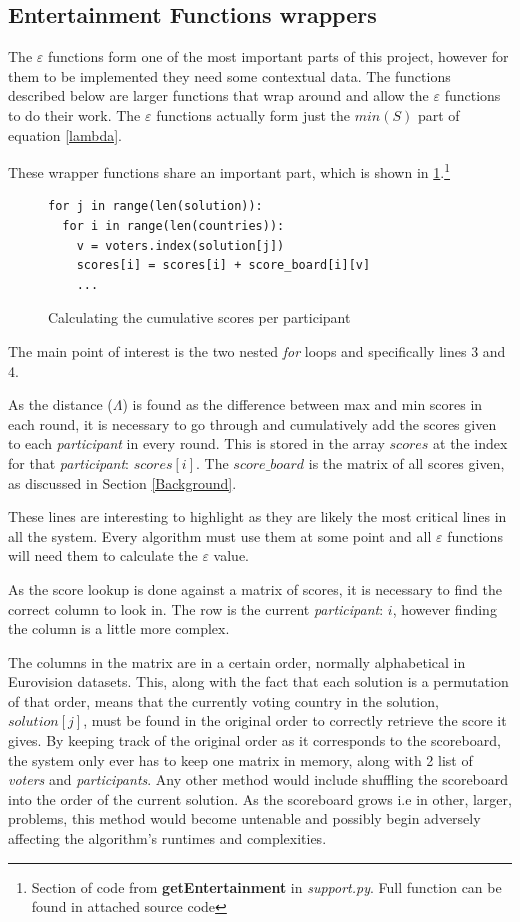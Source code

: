 \documentclass[12pt]{report}
\begin{document}
\subsection{Entertainment Functions wrappers}\label{Imp-Ewrappers}
The $\varepsilon$ functions form one of the most important parts of this project, however for them to be implemented they need some contextual data. The functions described below are larger functions that wrap around and allow the $\varepsilon$ functions to do their work. The $\varepsilon$ functions actually form just the $min(S)$ part of equation \ref{lambda}. 

These wrapper functions share an important part, which is shown in \ref{findScores}.\footnote{Section of code from \textbf{getEntertainment} in \textit{support.py}. Full function can be found in attached source code}

\begin{figure}[H]
\caption{Calculating the cumulative scores per participant}
\label{findScores}
\begin{lstlisting}
for j in range(len(solution)):
  for i in range(len(countries)):
    v = voters.index(solution[j])
    scores[i] = scores[i] + score_board[i][v]
    ...
\end{lstlisting}
\end{figure}

The main point of interest is the two nested \textit{for} loops and specifically lines 3 and 4.

As the distance ($\Lambda$) is found as the difference between max and min scores in each round, it is necessary to go through and cumulatively add the scores given to each \textit{participant} in every round. This is stored in the array $scores$ at the index for that \textit{participant}: $scores[i]$. The $score\_board$ is the matrix of all scores given, as discussed in Section \ref{Background}. 

These lines are interesting to highlight as they are likely the most critical lines in all the system. Every algorithm must use them at some point and all $\varepsilon$ functions will need them to calculate the $\varepsilon$ value.

As the score lookup is done against a matrix of scores, it is necessary to find the correct column to look in. The row is the current \textit{participant}: $i$, however finding the column is a little more complex. 

The columns in the matrix are in a certain order, normally alphabetical in Eurovision datasets. This, along with the fact that each solution is a permutation of that order, means that the currently voting country in the solution, $solution[j]$, must be found in the original order to correctly retrieve the score it gives. By keeping track of the original order as it corresponds to the scoreboard, the system only ever has to keep one matrix in memory, along with 2 list of \textit{voters} and \textit{participants}. Any other method would include shuffling the scoreboard into the order of the current solution. As the scoreboard grows i.e in other, larger, problems, this method would become untenable and possibly begin adversely affecting the algorithm's runtimes and complexities.
\end{document}
